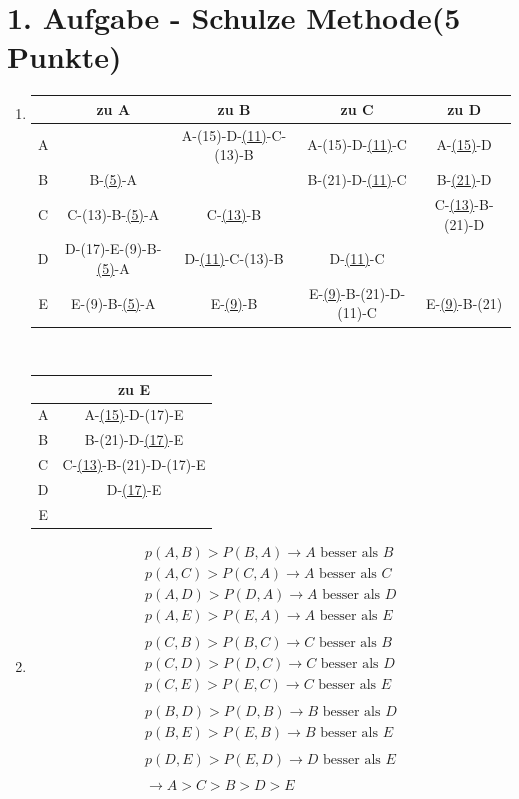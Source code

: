 \documentclass[a4paper, 11pt]{article}
\begin{document}
\section*{1. Aufgabe - Schulze Methode\hfill {\small (5 Punkte)}}
\begin{enumerate}
\item
\begin{tabular}{c || c|c|c|c}
& zu A & zu B & zu C & zu D \\ \hline
A & & A-(15)-D-\underline{(11)}-C-(13)-B & A-(15)-D-\underline{(11)}-C & A-\underline{(15)}-D \\
B & B-\underline{(5)}-A & & B-(21)-D-\underline{(11)}-C  & B-\underline{(21)}-D \\
C & C-(13)-B-\underline{(5)}-A & C-\underline{(13)}-B & & C-\underline{(13)}-B-(21)-D \\
D & D-(17)-E-(9)-B-\underline{(5)}-A & D-\underline{(11)}-C-(13)-B & D-\underline{(11)}-C & \\
E & E-(9)-B-\underline{(5)}-A & E-\underline{(9)}-B & E-\underline{(9)}-B-(21)-D-(11)-C & E-\underline{(9)}-B-(21)


\end{tabular}\\
\begin{tabular}{c || c}
& zu E\\ \hline
A & A-\underline{(15)}-D-(17)-E\\
B  & B-(21)-D-\underline{(17)}-E\\
C & C-\underline{(13)}-B-(21)-D-(17)-E\\
D & D-\underline{(17)}-E\\
E &


\end{tabular}

\item 
\begin{align*}
p(A,B) > P(B,A) \rightarrow A \text{ besser als } B \\
p(A,C) > P(C,A) \rightarrow A \text{ besser als } C \\
p(A,D) > P(D,A) \rightarrow A \text{ besser als } D \\
p(A,E) > P(E,A) \rightarrow A \text{ besser als } E \\
\\
p(C,B) > P(B,C) \rightarrow C \text{ besser als } B \\
p(C,D) > P(D,C) \rightarrow C \text{ besser als } D \\
p(C,E) > P(E,C) \rightarrow C \text{ besser als } E \\
\\
p(B,D) > P(D,B) \rightarrow B \text{ besser als } D \\
p(B,E) > P(E,B) \rightarrow B \text{ besser als } E \\
\\
p(D,E) > P(E,D) \rightarrow D \text{ besser als } E \\
\\
\rightarrow A > C > B > D > E
\end{align*}
\end{enumerate}
\end{document}
